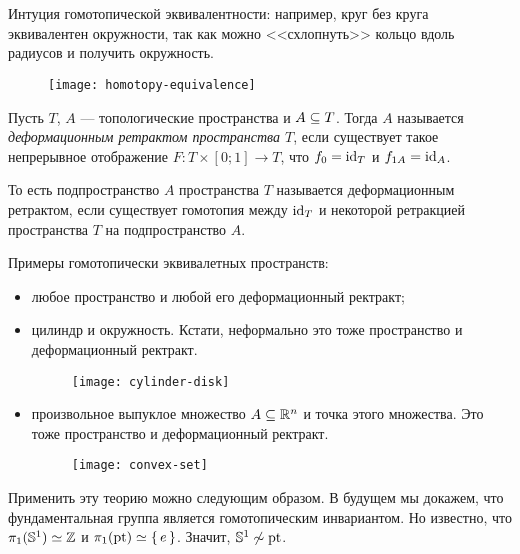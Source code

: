 \documentclass[main]{subfiles}
\begin{document}

\section{}

Интуция гомотопической эквивалентности: например, круг без круга эквивалентен окружности, так как можно
<<схлопнуть>> кольцо вдоль радиусов и получить окружность.

\begin{figure}[H]
	\centering \texttt{[image: homotopy-equivalence]}
\end{figure}

\begin{definition}
	Пусть $ T $, $ A $ --- топологические пространства и $ A \subseteq T $. Тогда $ A $ называется \emph{деформационным
	ретрактом пространства $ T $}, если существует такое непрерывное отображение $ F \colon T \times [0; 1] \to T $,
	что $ f_0 = \operatorname{id}_T $ и $ f_{1 A} = \operatorname{id}_A $.
\end{definition}

\begin{remark}
	То есть подпространство $ A $ пространства $ T $ называется деформационным ретрактом, если существует гомотопия
	между $ \operatorname{id}_T $ и некоторой ретракцией пространства $ T $ на подпространство $ A $.
\end{remark}

\begin{example} Примеры гомотопически эквивалетных пространств:
	\begin{itemize}
		\item любое пространство и любой его деформационный ректракт;
		\item цилиндр и окружность. Кстати, неформально это тоже пространство и деформационный ректракт.
			\begin{figure}[H]
				\centering \texttt{[image: cylinder-disk]}
			\end{figure}
		\item произвольное выпуклое множество $ A \subseteq \mathbb{R}^n $ и точка этого множества. Это тоже пространство и
			деформационный ректракт.
			\begin{figure}[H]
				\centering \texttt{[image: convex-set]}
			\end{figure}
	\end{itemize}
\end{example}

\begin{example}
	Применить эту теорию можно следующим образом. В будущем мы докажем, что фундаментальная группа является
	гомотопическим инвариантом. Но известно, что $ \pi_1(\mathbb{S}^1) \simeq \mathbb{Z} $ и $ \pi_1(\operatorname{pt}) \simeq \left\{\,e\,\right\} $.
	Значит, $ \mathbb{S}^1 \not \sim \operatorname{pt} $.
\end{example}
\end{document}
